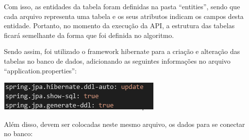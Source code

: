\documentclass[conference]{IEEEtran}
\begin{document}
Com isso, as entidades da tabela foram definidas na pasta “entities”, sendo que cada arquivo representa uma tabela e os seus atributos indicam os campos desta entidade. Portanto, no momento da execução da API, a estrutura das tabelas ficará semelhante da forma que foi definida no algoritmo.

Sendo assim, foi utilizado o framework hibernate para a criação e alteração das tabelas no banco de dados, adicionando as seguintes informações no arquivo “application.properties”:

\vspace{7mm}
\centerline{\includegraphics{AlgoritmoHibernate.png}}
\vspace{7mm}

Além disso, devem ser colocadas neste mesmo arquivo, os dados para se conectar no banco:
\end{document}
